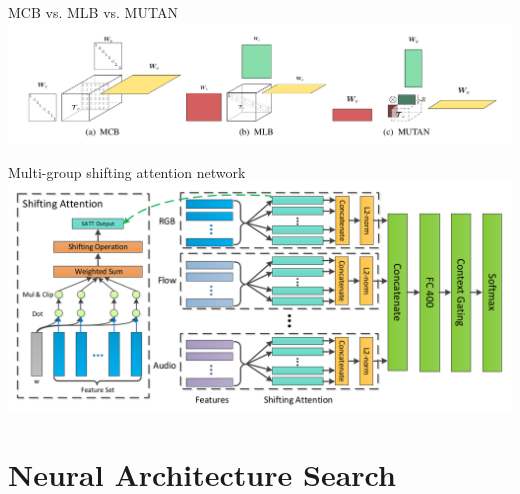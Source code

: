 \documentclass{beamer}
\begin{document}
{%
%
\begin{frame}{MCB vs. MLB vs. MUTAN}
        \center{}
        \hspace*{-0.9cm}
        \includegraphics[scale=0.31]{data/mcb_mlb_mutan}
\end{frame}
}

{%
\begin{frame}{Multi-group shifting attention network}
        \center{}
        \vspace{-0.8cm}
        \hspace*{-0.9cm}
        \includegraphics[scale=0.34]{data/multi_group_shifting_attn}
\end{frame}
}




\section{Neural Architecture Search}
\end{document}
